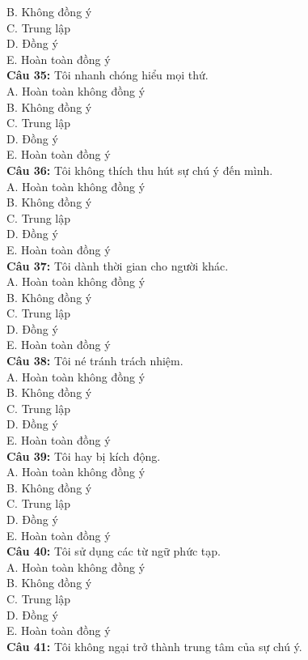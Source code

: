 \begin{multicols}{2}
B. Không đồng ý \\
C. Trung lập \\
D. Đồng ý \\
E. Hoàn toàn đồng ý \\
\textbf{Câu 35:} Tôi nhanh chóng hiểu mọi thứ. \\
A. Hoàn toàn không đồng ý \\
B. Không đồng ý \\
C. Trung lập \\
D. Đồng ý \\
E. Hoàn toàn đồng ý \\
\textbf{Câu 36:} Tôi không thích thu hút sự chú ý đến mình. \\
A. Hoàn toàn không đồng ý \\
B. Không đồng ý \\
C. Trung lập \\
D. Đồng ý \\
E. Hoàn toàn đồng ý \\
\textbf{Câu 37:} Tôi dành thời gian cho người khác. \\
A. Hoàn toàn không đồng ý \\
B. Không đồng ý \\
C. Trung lập \\
D. Đồng ý \\
E. Hoàn toàn đồng ý \\
\textbf{Câu 38:} Tôi né tránh trách nhiệm. \\
A. Hoàn toàn không đồng ý \\
B. Không đồng ý \\
C. Trung lập \\
D. Đồng ý \\
E. Hoàn toàn đồng ý \\
\textbf{Câu 39:} Tôi hay bị kích động. \\
A. Hoàn toàn không đồng ý \\
B. Không đồng ý \\
C. Trung lập \\
D. Đồng ý \\
E. Hoàn toàn đồng ý \\
\textbf{Câu 40:} Tôi sử dụng các từ ngữ phức tạp. \\
A. Hoàn toàn không đồng ý \\
B. Không đồng ý \\
C. Trung lập \\
D. Đồng ý \\
E. Hoàn toàn đồng ý \\
\textbf{Câu 41:} Tôi không ngại trở thành trung tâm của sự chú ý. \\

\end{multicols}
